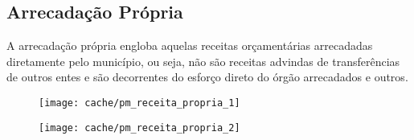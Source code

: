 
\subsection{Arrecadação Própria}

A arrecadação própria engloba aquelas receitas orçamentárias arrecadadas diretamente pelo município, ou seja, não são receitas advindas de transferências de outros entes e são decorrentes do esforço direto do órgão arrecadados e outros.





\begin{figure}[H]
\center
\texttt{[image: cache/pm\_receita\_propria\_1]}
\end{figure}

\begin{figure}[H]
\center
\texttt{[image: cache/pm\_receita\_propria\_2]}
\end{figure}
